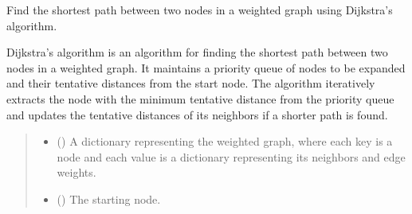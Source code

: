 \documentclass[letterpaper,10pt,english]{sphinxmanual}
\begin{document}

\begin{fulllineitems}
\label{\detokenize{documentation:loanpy.scapplier.dijkstra}}
\pysigstartsignatures
{}
\pysigstopsignatures
\sphinxAtStartPar
Find the shortest path between two nodes in a weighted graph
using Dijkstra’s algorithm.

\sphinxAtStartPar
Dijkstra’s algorithm is an algorithm for finding the shortest path
between two nodes in a weighted graph. It
maintains a priority queue of nodes to be expanded and their tentative
distances from the start node. The
algorithm iteratively extracts the node with the minimum tentative
distance from the priority queue and updates
the tentative distances of its neighbors if a shorter path is found.
\begin{quote}\begin{description}
\begin{itemize}
\item {} 
\sphinxAtStartPar
{} () \textendash{} A dictionary representing the weighted graph, where each
key is a node and each value is a
dictionary representing its neighbors and edge weights.

\item {} 
\sphinxAtStartPar
{} () \textendash{} The starting node.


\end{itemize}
\end{description}
\end{quote}
\end{fulllineitems}
\end{document}
